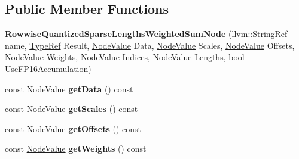 \subsection*{Public Member Functions}
\begin{DoxyCompactItemize}
\item 
\mbox{\label{classglow_1_1_rowwise_quantized_sparse_lengths_weighted_sum_node_ac1f2b82d6cf1e88eb1294f67646fb0d1}} 
{\bfseries Rowwise\+Quantized\+Sparse\+Lengths\+Weighted\+Sum\+Node} (llvm\+::\+String\+Ref name, \hyperlink{structglow_1_1_type}{Type\+Ref} Result, \hyperlink{structglow_1_1_node_value}{Node\+Value} Data, \hyperlink{structglow_1_1_node_value}{Node\+Value} Scales, \hyperlink{structglow_1_1_node_value}{Node\+Value} Offsets, \hyperlink{structglow_1_1_node_value}{Node\+Value} Weights, \hyperlink{structglow_1_1_node_value}{Node\+Value} Indices, \hyperlink{structglow_1_1_node_value}{Node\+Value} Lengths, bool Use\+F\+P16\+Accumulation)
\item 
\mbox{\label{classglow_1_1_rowwise_quantized_sparse_lengths_weighted_sum_node_aaf55944c3536fddac53a5e7acc4d3630}} 
const \hyperlink{structglow_1_1_node_value}{Node\+Value} {\bfseries get\+Data} () const
\item 
\mbox{\label{classglow_1_1_rowwise_quantized_sparse_lengths_weighted_sum_node_ac5066abfa123d22919b2fc69b889fb07}} 
const \hyperlink{structglow_1_1_node_value}{Node\+Value} {\bfseries get\+Scales} () const
\item 
\mbox{\label{classglow_1_1_rowwise_quantized_sparse_lengths_weighted_sum_node_a6cf03d25e0fba3c06f10b14aafa14283}} 
const \hyperlink{structglow_1_1_node_value}{Node\+Value} {\bfseries get\+Offsets} () const
\item 
\mbox{\label{classglow_1_1_rowwise_quantized_sparse_lengths_weighted_sum_node_a08fd2ea280c30b4a610c32b6f7aadb76}} 
const \hyperlink{structglow_1_1_node_value}{Node\+Value} {\bfseries get\+Weights} () const
\item 
\mbox{\label{classglow_1_1_rowwise_quantized_sparse_lengths_weighted_sum_node_ada10565683eb0440b254989a151b2d46}} 

\end{DoxyCompactItemize}
